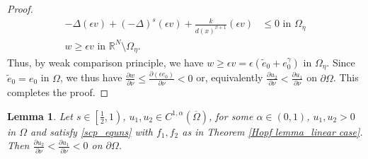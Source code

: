 \documentclass[reqno,oneside]{amsart}
\newtheorem{lemma}[theorem]{Lemma}
\theoremstyle{definition}
\theoremstyle{remark}
\numberwithin{equation}{section}
\newcommand{\ba}{\beta}
\newcommand{\Om} {\Omega}
\newcommand{\pa}{\partial}
\newcommand{\sr}{\mathbb{R}}
\newcommand{\De} {\Delta}
\newcommand{\et}{\tilde{e}_0}
\begin{document}
\begin{proof}
\begin{equation}
\begin{aligned}
            -\Delta (\epsilon v) + (-\De)^s (\epsilon v) + \frac{k}{d(x)^{\ba +1}} (\epsilon v) &\leq 0 \text{ in } \Om_{\eta}\\
            w \geq \epsilon v \text{ in } \sr^N \setminus \Om_{\eta}.
        \end{aligned}
    \end{equation}
    Thus, by weak comparison principle, we have $w \geq \epsilon v = \epsilon \left(\et + e_0^{\gamma}\right)$ in $\Om_{\eta}$. Since $\et = e_0$ in $\Om$, we thus have $\frac{\pa w}{\pa\nu} \leq \frac{\pa \left(\epsilon e_0\right)}{\pa\nu} < 0$ or, equivalently $\frac{\pa u_2}{\pa\nu} < \frac{\pa u_1}{\pa\nu}$ on $\pa\Om$. This completes the proof.
\end{proof}

\begin{lemma}\label{hopf_second}
    Let $s \in \left[\frac{1}{2}, 1\right)$, $u_1, u_2 \in C^{1,\alpha}(\overline{\Om})$, for some $\alpha\in(0,1)$, $u_1, u_2 > 0$ in $\Om$ and satisfy \eqref{scp_equns} with $f_1, f_2$ as in Theorem \ref{Hopf lemma_linear case}. Then $\frac{\pa u_2}{\pa\nu} < \frac{\pa u_1}{\pa\nu} < 0$ on $\pa\Om$.
\end{lemma}
\end{document}
